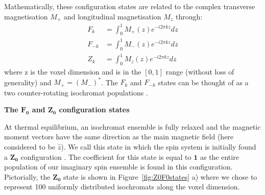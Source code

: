 \hfill

Mathematically, these configuration states are related to
the complex transverse magnetisation $M_{+}$ and longitudinal magnetisation $M_z$ \cite{Hennig1991} through:
\begin{equation}
\begin{split}
    F_{k}  & = \int_0^1 M_{+}(z) e^{- i 2\pi k z} dz \\ %
    F_{-k} & = \int_0^1 M_{-}(z) e^{- i 2\pi k z} dz \\ %
    Z_{k} & = \int_0^1 M_{z}(z) e^{- i 2\pi k z} dz %
\end{split}    
\end{equation}
where z is the voxel dimension and is in the $[0,1]$ range (without loss of generality) and $M_+ = (M_-)^*$.
The $F_{k}$ and $F_{-k}$ states can be thought of as a two counter-rotating isochromat populations \cite{Brown}.

\hfill

\textbf{The $\bm{F_0}$ and $\bm{Z_0}$ configuration states}

At thermal equilibrium, an isochromat ensemble is fully relaxed and the magnetic moment vectors have the same direction as the main magnetic field (here considered to be $\hat{z}$).
We call this state in which the spin system is initially found a $\bm{Z_0}$ configuration \cite{Weigel2015} \cite{Scheffler1999} \cite{Hennig1991}.
The coefficient for this state is equal to $\bm{1}$ as the entire population of our imaginary spin ensemble is found in this configuration.
Pictorially, the $\bm{Z_0}$ state is shown in Figure~\ref{fig:Z0F0states} a) where we chose to represent 100 uniformly distributed isochromats along the voxel dimension.

